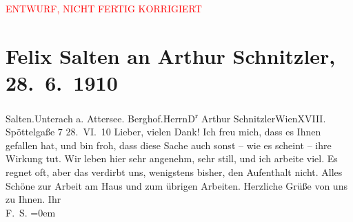 
\begin{center}
            \textcolor{red}{ENTWURF, NICHT FERTIG KORRIGIERT}
                      \end{center}
            
         \renewcommand{\erwaehnteOrte}{Orte: Berghof, Edmund-Weiß-Gasse, Unterach am Attersee, Wien}
         \renewcommand{\erwaehnteWerke}{}
               \section[Felix Salten an Arthur Schnitzler, 28. 6. 1910]{ Felix Salten an Arthur Schnitzler, 28. 6. 1910}\nopagebreak{}\rehead{ }\begin{ledgroupsized}[t]{13cm}\normalsize\beginnumbering \toendnotes[C]{\smallbreak\pagebreak[2]} 
\pstart{}{\pb}Salten.\pend{}\pstart{}Unterach a. Attersee. Berghof.\pend{}{\bigskip}\pstart{}Herrn\pend{}\pstart{}D\textsuperscript{r} Arthur Schnitzler\pend{}\pstart{}Wien\pend{}\pstart{}XVIII. Spöttelgaße 7\pend{}{\bigskip}\pstart
           \raggedleft{}{\pb}28. VI. 10\pend
           \pstart{}Lieber,\pend\pstart
           vielen Dank! Ich freu mich, dass es Ihnen gefallen hat, und bin froh, dass diese
               Sache auch sonst – wie es scheint – ihre Wirkung tut. Wir leben hier sehr angenehm,
               sehr still, und ich arbeite viel. Es regnet oft, aber das verdirbt uns, wenigstens
               bisher, den Aufenthalt nicht. Alles Schöne zur Arbeit am Haus und zum übrigen
               Arbeiten. Herzliche Grüße von uns zu Ihnen.\pend
           \pstart
           Ihr{\\[\baselineskip]}\spacefill\mbox{F. S.}\pend
           \leftskip=0em{}
         
         \endnumbering{}\end{ledgroupsized}\begin{anhang}\end{anhang}\newcommand{\dateiname}{L03549}\newcommand{\titel}{Felix Salten an Arthur Schnitzler, 28. 6. 1910}\newcommand{\editorInnen}{Martin Anton Müller und Laura Untner}
      